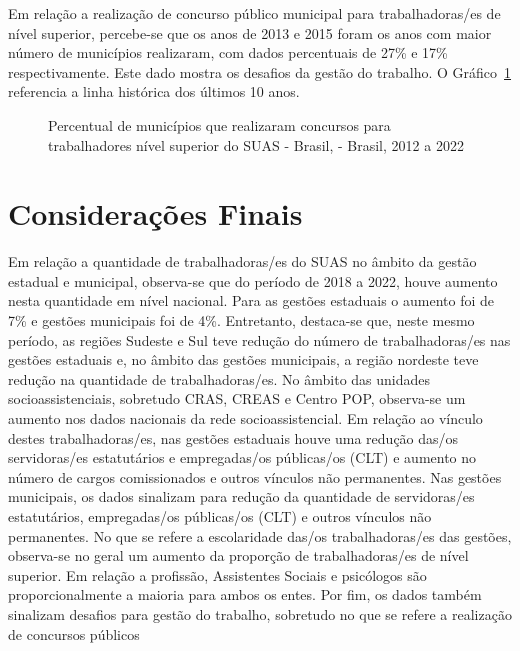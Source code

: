 \documentclass[
  letterpaper,
  DIV=11,
  numbers=noendperiod]{scrreprt}
\begin{document}
Em relação a realização de concurso público municipal para
trabalhadoras/es de nível superior, percebe-se que os anos de 2013 e
2015 foram os anos com maior número de municípios realizaram, com dados
percentuais de 27\% e 17\% respectivamente. Este dado mostra os desafios
da gestão do trabalho. O Gráfico~\ref{fig-conc_munic} referencia a linha
histórica dos últimos 10 anos.

\begin{figure}


\caption{\label{fig-conc_munic}Percentual de municípios que realizaram
concursos para trabalhadores nível superior do SUAS - Brasil, - Brasil,
2012 a 2022}

\end{figure}%

\section{Considerações Finais}\label{considerauxe7uxf5es-finais-3}

Em relação a quantidade de trabalhadoras/es do SUAS no âmbito da gestão
estadual e municipal, observa-se que do período de 2018 a 2022, houve
aumento nesta quantidade em nível nacional. Para as gestões estaduais o
aumento foi de 7\% e gestões municipais foi de 4\%. Entretanto,
destaca-se que, neste mesmo período, as regiões Sudeste e Sul teve
redução do número de trabalhadoras/es nas gestões estaduais e, no âmbito
das gestões municipais, a região nordeste teve redução na quantidade de
trabalhadoras/es. No âmbito das unidades socioassistenciais, sobretudo
CRAS, CREAS e Centro POP, observa-se um aumento nos dados nacionais da
rede socioassistencial. Em relação ao vínculo destes trabalhadoras/es,
nas gestões estaduais houve uma redução das/os servidoras/es
estatutários e empregadas/os públicas/os (CLT) e aumento no número de
cargos comissionados e outros vínculos não permanentes. Nas gestões
municipais, os dados sinalizam para redução da quantidade de
servidoras/es estatutários, empregadas/os públicas/os (CLT) e outros
vínculos não permanentes. No que se refere a escolaridade das/os
trabalhadoras/es das gestões, observa-se no geral um aumento da
proporção de trabalhadoras/es de nível superior. Em relação a profissão,
Assistentes Sociais e psicólogos são proporcionalmente a maioria para
ambos os entes. Por fim, os dados também sinalizam desafios para gestão
do trabalho, sobretudo no que se refere a realização de concursos
públicos
\end{document}
